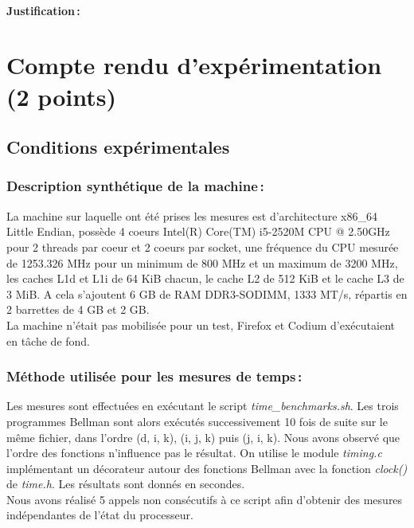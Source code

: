 \documentclass[a4paper, 10pt, french]{article}
\begin{document}
\paragraph{Justification\,: }


\section{Compte rendu d'expérimentation (2 points)}
\subsection{Conditions expérimentales}

\subsubsection{Description synthétique de la machine\,:}

La machine sur laquelle ont été prises les mesures est d'architecture x86\_64 Little Endian, possède 4 coeurs Intel(R) Core(TM) i5-2520M CPU @ 2.50GHz pour 2 threads par coeur et 2 coeurs par socket, une fréquence du CPU mesurée de 1253.326 MHz pour un minimum de 800 MHz et un maximum de 3200 MHz, les caches L1d et L1i de 64 KiB chacun, le cache L2 de 512 KiB et le cache L3 de 3 MiB. 
A cela s'ajoutent 6 GB de RAM DDR3-SODIMM, 1333 MT/s, répartis en 2 barrettes de 4 GB et 2 GB.
\\

La machine n'était pas mobilisée pour un test, Firefox et Codium d'exécutaient en tâche de fond.

\subsubsection{Méthode utilisée pour les mesures de temps\,: }

Les mesures sont effectuées en exécutant le script {\em time\_benchmarks.sh}. Les trois programmes Bellman sont alors exécutés successivement 10 fois de suite sur le même fichier, dans l'ordre (d, i, k), (i, j, k) puis (j, i, k). Nous avons observé que l'ordre des fonctions n'influence pas le résultat. 
On utilise le module {\em timing.c} implémentant un décorateur autour des fonctions Bellman avec la fonction {\em clock()} de {\em time.h}. Les résultats sont donnés en secondes. \\

Nous avons réalisé 5 appels non consécutifs à ce script afin d'obtenir des mesures indépendantes de l'état du processeur. \\
\end{document}
